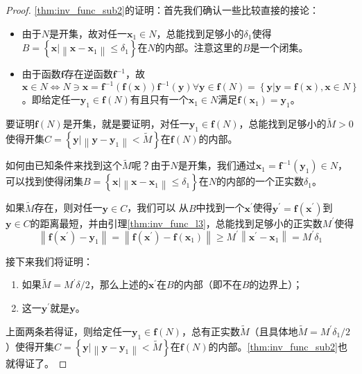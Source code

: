 \documentclass[main.tex]{subfiles}
\begin{document}
\begin{proof}
    \ref{thm:inv_func_sub2}的证明：首先我们确认一些比较直接的接论：
    \begin{itemize}
        \item 由于$N$是开集，故对任一$\mathbf{x}_1\in N$，总能找到足够小的$\delta_1$使得$B=\left\{\mathbf{x}|\left\|\mathbf{x}-\mathbf{x}_1\right\|\leq\delta_1\right\}$在$N$的内部。注意这里的$B$是一个闭集。
        \item 由于函数$\mathbf{f}$存在逆函数$\mathbf{f}^{-1}$，故$\mathbf{x}\in N\Leftrightarrow N\ni \mathbf{x}= \mathbf{f}^{-1}\left(\mathbf{f}\left(\mathbf{x}\right)\right)\mathbf{f}^{-1}\left(\mathbf{y}\right)\forall \mathbf{y}\in\mathbf{f}\left(N\right)=\left\{\mathbf{y}|\mathbf{y}=\mathbf{f}\left(\mathbf{x}\right),\mathbf{x}\in N\right\}$。即给定任一$\mathbf{y}_1\in\mathbf{f}\left(N\right)$有且只有一个$\mathbf{x}_1\in N$满足$\mathbf{f}\left(\mathbf{x}_1\right)=\mathbf{y}_1$。
    \end{itemize}

    要证明$\mathbf{f}\left(N\right)$是开集，就是要证明，对任一$\mathbf{y}_1\in\mathbf{f}\left(N\right)$，总能找到足够小的$\widetilde{M}>0$使得开集$C=\left\{\mathbf{y}|\left\|\mathbf{y}-\mathbf{y}_1\right\|<\widetilde{M}\right\}$在$\mathbf{f}\left(N\right)$的内部。

    如何由已知条件来找到这个$\widetilde{M}$呢？由于$N$是开集，我们通过$\mathbf{x}_1=\mathbf{f}^{-1}\left(\mathbf{y}_1\right)\in N$，可以找到使得闭集$B=\left\{\mathbf{x}|\left\|\mathbf{x}-\mathbf{x}_1\right\|\leq\delta_1\right\}$在$N$的内部的一个正实数$\delta_1$。

    如果$\widetilde{M}$存在，则对任一$\mathbf{y}\in C$，我们可以
    从$B$中找到一个$\mathbf{x}^\prime$使得$\mathbf{y}^\prime=\mathbf{f}\left(\mathbf{x}^\prime\right)$到$\mathbf{y}\in C$的距离最短，并由引理\ref{thm:inv_func_l3}，总能找到足够小的正实数$M^\prime$使得
    \[\left\|\mathbf{f}\left(\mathbf{x}^\prime\right)-\mathbf{y}_1\right\|=\left\|\mathbf{f}\left(\mathbf{x}^\prime\right)-\mathbf{f}\left(\mathbf{x}_1\right)\right\|\geq M^\prime\left\|\mathbf{x}^\prime-\mathbf{x}_1\right\|=M^\prime\delta_1
    \]

    接下来我们将证明：
    \begin{enumerate}[label=\roman*]
        \item\label{thm:inv_func_sub2_sub1} 如果$\widetilde{M}=M^\prime\delta/2$，那么上述的$\mathbf{x}^\prime$在$B$的内部（即不在$B$的边界上）；
        \item\label{thm:inv_func_sub2_sub2} 这一$\mathbf{y}^\prime$就是$\mathbf{y}$。
    \end{enumerate}
    上面两条若得证，则给定任一$\mathbf{y}_1\in\mathbf{f}\left(N\right)$，总有正实数$\widetilde{M}$（且具体地$\widetilde{M}=M^\prime\delta_1/2$）使得开集$C=\left\{\mathbf{y}|\left\|\mathbf{y}-\mathbf{y}_1\right\|<\widetilde{M}\right\}$在$\mathbf{f}\left(N\right)$的内部。\ref{thm:inv_func_sub2}也就得证了。


\end{proof}
\end{document}
